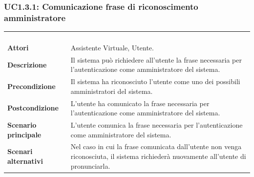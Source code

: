 \subsubsection{UC1.3.1: Comunicazione frase di riconoscimento amministratore}
\label{UC1.3.1}
\begin{longtable}{l|p{10cm}}
\rowcolor[gray]{0.8} \multicolumn{2}{c}{} \\
\rowcolor[gray]{0.8} \multicolumn{2}{c}{\textbf{UC1.3.1 - Comunicazione frase di riconoscimento amministratore}} \\
\rowcolor[gray]{0.8} \multicolumn{2}{c}{} \\
\hline
&\\
\textbf{Attori} & Assistente Virtuale, Utente.\\[7pt]
\textbf{Descrizione} & Il sistema può richiedere all'utente la frase necessaria per l'autenticazione come amministratore del sistema. \\[7pt]
\textbf{Precondizione} & Il sistema ha riconosciuto l'utente come uno dei possibili amministratori del sistema.\\[7pt]
\textbf{Postcondizione} & L'utente ha comunicato la frase necessaria per l'autenticazione come amministratore del sistema.\\[7pt]
\textbf{Scenario principale} &L'utente comunica la frase necessaria per l'autenticazione come amministratore del sistema. \\[7pt]
\textbf{Scenari alternativi} & Nel caso in cui la frase comunicata dall'utente non venga riconosciuta, il sistema richiederà nuovamente all'utente di pronunciarla.\\[7pt]\hline
\end{longtable}

